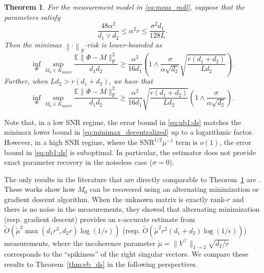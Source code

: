 \documentclass[11pt]{article}
\newtheorem{theorem}[lemma]{Theorem}
\newcommand{\norm}[1]{\left \|#1 \right \|}
\newcommand{\E}{\mathbb{E}}
\begin{document}
\begin{theorem}
\label{thm:minimax_ds}
For the measurement model in \eqref{eq:meas_mdl}, suppose that the parameters satisfy 
\begin{equation*}
   \frac{48 \alpha^2}{d_1 \vee d_2} \leq \alpha^2 r \leq \frac{\sigma^2 d_1}{128 L}.
\end{equation*} 
Then the minimax $\norm{\cdot}_\mathrm{F}$-risk is lower-bounded as
\begin{equation}
\label{eq:minimax_decentralized}
    {\inf_{\Phi}} \sup_{M_0 \in K_\mathrm{mixed}} \frac{\E \|\Phi - M\|_\mathrm{F}^2 }{d_1 d_2} \geq \frac{\alpha^2}{16 d_1} \left( 1 \wedge \frac{\sigma}{\alpha\sqrt{d_2}} \sqrt{\frac{r(d_1 + d_2)}{L d_2}} \right).
\end{equation}
Further, when $Ld_2 > r(d_1+d_2)$, we have that 
\begin{equation}
    \label{eq:minimax_reformatted}
     {\inf_{\Phi}} \sup_{M_0 \in K_\mathrm{mixed}} \frac{\E \|\Phi - M\|_\mathrm{F}^2 }{d_1 d_2} \geq \frac{\alpha^2}{16 d_1} \sqrt{\frac{r(d_1+d_2)}{Ld_2}} \left( 1 \wedge \frac{\sigma}{\alpha\sqrt{d_2}} \right).
\end{equation}
\end{theorem}

Note that, in a low SNR regime, the error bound in \eqref{eq:ub1:ds} matches the minimax lower bound in \eqref{eq:minimax_decentralized} up to a logarithmic factor. 
However, in a high SNR regime, where the $\mathrm{SNR}^{1/2} \mu^{-1}$ term is $o(1)$, the error bound in \eqref{eq:ub1:ds} is suboptimal. 
In particular, the estimator does not provide exact parameter recovery in the noiseless case ($\sigma = 0$). 

The only results in the literature that are directly comparable to Theorem~\ref{thm:minimax_ds} are \citep{nayer2019phaseless,nayer2021fast}.  These works show how $M_0$ can be recovered using an alternating minimization or gradient descent algorithm.  When the unknown matrix is exactly rank-$r$ and there is no noise in the measurements, they showed that alternating minimization (resp. gradient descent) provides an $\epsilon$-accurate estimate from $\widetilde{O}(\tilde{\mu}^2\max(d_1r^3,d_2r)\log(1/\epsilon))$ (resp. $\widetilde{O}(\tilde{\mu}^2 r^2(d_1+d_2) \log(1/\epsilon))$) measurements, where the incoherence parameter $\tilde{\mu} = \|V^\top\|_{1\to 2} \sqrt{d_2/r}$ corresponds to the ``spikiness'' of the right singular vectors. 
We compare these results to Theorem~\ref{thm:eb_ds} in the following perspectives. 
\end{document}
